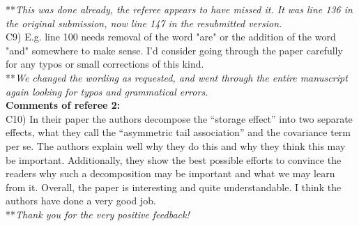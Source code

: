 \documentclass[letterpaper,11pt]{article}
\begin{document}
\noindent ***\emph{This was done already, the referee appears to have missed it. It was line 136 in the original submission,
now line 147 in the resubmitted version.} \\

\noindent C9) E.g. line 100 needs removal of the word "are" or the addition of the word "and" somewhere to make sense. I'd consider going through the paper carefully for any typos or small corrections of this kind. \\

\noindent ***\emph{We changed the wording as requested, and went through the entire manuscript again looking for typos
and grammatical errors.} \\

\noindent \textbf{Comments of referee 2:} \\

\noindent C10) In their paper the authors decompose the “storage effect” into two separate effects, what they call the “asymmetric tail association” and the covariance term per se. The authors explain well why they do this and why they think this may be important. Additionally, they show the best possible efforts to convince the readers why such a decomposition may be important and what we may learn from it. Overall, the paper is interesting and quite understandable. I think the authors have done a very good job. \\

\noindent ***\emph{Thank you for the very positive feedback!} \\
\end{document}
